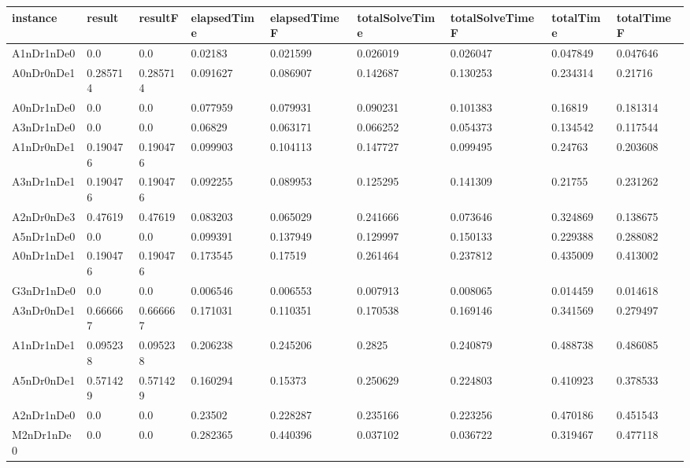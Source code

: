 \documentclass[../thesis.tex]{subfiles}
\begin{document}
\begin{table}[!ht]
    \centering
    \begin{tabular}{|l|l|l|l|l|l|l|l|l|}
    \hline
        instance & result & resultF & elapsedTime & elapsedTimeF & totalSolveTime & totalSolveTimeF & totalTime & totalTimeF \\ \hline
        A1nDr1nDe0 & 0.0 & 0.0 & 0.02183 & 0.021599 & 0.026019 & 0.026047 & 0.047849 & 0.047646 \\ \hline
        A0nDr0nDe1 & 0.285714 & 0.285714 & 0.091627 & 0.086907 & 0.142687 & 0.130253 & 0.234314 & 0.21716 \\ \hline
        A0nDr1nDe0 & 0.0 & 0.0 & 0.077959 & 0.079931 & 0.090231 & 0.101383 & 0.16819 & 0.181314 \\ \hline
        A3nDr1nDe0 & 0.0 & 0.0 & 0.06829 & 0.063171 & 0.066252 & 0.054373 & 0.134542 & 0.117544 \\ \hline
        A1nDr0nDe1 & 0.190476 & 0.190476 & 0.099903 & 0.104113 & 0.147727 & 0.099495 & 0.24763 & 0.203608 \\ \hline
        A3nDr1nDe1 & 0.190476 & 0.190476 & 0.092255 & 0.089953 & 0.125295 & 0.141309 & 0.21755 & 0.231262 \\ \hline
        A2nDr0nDe3 & 0.47619 & 0.47619 & 0.083203 & 0.065029 & 0.241666 & 0.073646 & 0.324869 & 0.138675 \\ \hline
        A5nDr1nDe0 & 0.0 & 0.0 & 0.099391 & 0.137949 & 0.129997 & 0.150133 & 0.229388 & 0.288082 \\ \hline
        A0nDr1nDe1 & 0.190476 & 0.190476 & 0.173545 & 0.17519 & 0.261464 & 0.237812 & 0.435009 & 0.413002 \\ \hline
        G3nDr1nDe0 & 0.0 & 0.0 & 0.006546 & 0.006553 & 0.007913 & 0.008065 & 0.014459 & 0.014618 \\ \hline
        A3nDr0nDe1 & 0.666667 & 0.666667 & 0.171031 & 0.110351 & 0.170538 & 0.169146 & 0.341569 & 0.279497 \\ \hline
        A1nDr1nDe1 & 0.095238 & 0.095238 & 0.206238 & 0.245206 & 0.2825 & 0.240879 & 0.488738 & 0.486085 \\ \hline
        A5nDr0nDe1 & 0.571429 & 0.571429 & 0.160294 & 0.15373 & 0.250629 & 0.224803 & 0.410923 & 0.378533 \\ \hline
        A2nDr1nDe0 & 0.0 & 0.0 & 0.23502 & 0.228287 & 0.235166 & 0.223256 & 0.470186 & 0.451543 \\ \hline
        M2nDr1nDe0 & 0.0 & 0.0 & 0.282365 & 0.440396 & 0.037102 & 0.036722 & 0.319467 & 0.477118 \\ \hline

\end{tabular}
\end{table}
\end{document}
